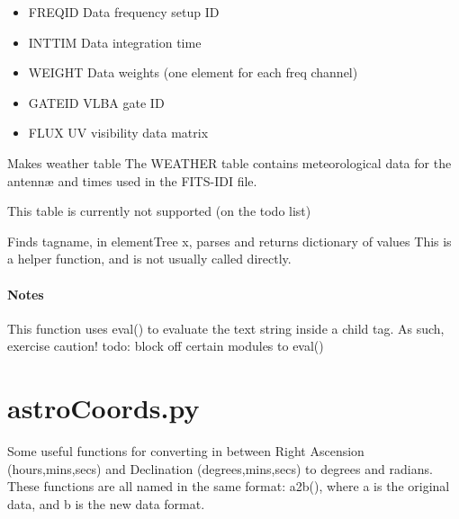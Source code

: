 \documentclass[letterpaper,10pt,english]{sphinxmanual}
\begin{document}
\begin{fulllineitems}
\begin{itemize}
\item {} 
FREQID       Data frequency setup ID

\item {} 
INTTIM       Data integration time

\item {} 
WEIGHT       Data weights (one element for each freq channel)

\item {} 
GATEID       VLBA gate ID

\item {} 
FLUX         UV visibility data matrix

\end{itemize}

\end{fulllineitems}



\begin{fulllineitems}
\label{index:pyFitsidi.make_weather}
Makes weather table
The WEATHER table contains meteorological data for the antennæ and times 
used in the FITS-IDI file.

This table is currently not supported (on the todo list)

\end{fulllineitems}



\begin{fulllineitems}
\label{index:pyFitsidi.parseConfig}
Finds tagname, in elementTree x, parses and returns dictionary of values
This is a helper function, and is not usually called directly.
\paragraph{Notes}

This function uses eval() to evaluate the text string inside a child tag. As such,
exercise caution! todo: block off certain modules to eval()

\end{fulllineitems}

\label{index:module-astroCoords}

\section{astroCoords.py}
\label{index:astrocoords-py}
Some useful functions for converting in between Right Ascension (hours,mins,secs)
and Declination (degrees,mins,secs) to degrees and radians. These functions are
all named in the same format: a2b(), where a is the original data, and b is the new
data format.
\end{document}
